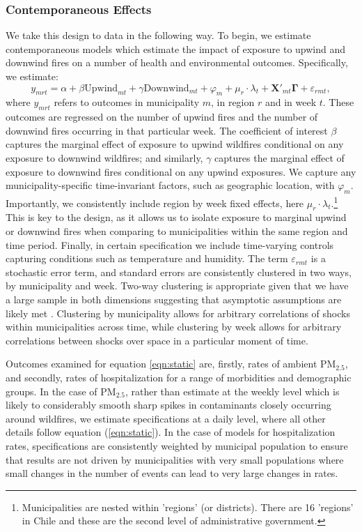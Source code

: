 \documentclass[11pt]{article}
\begin{document}
\begin{spacing}{1.5}
\subsubsection{Contemporaneous Effects}
We take this design to data in the following way.  To begin, we estimate contemporaneous models which estimate the impact of exposure to upwind and downwind fires on a number of health and environmental outcomes.  Specifically, we estimate:
\begin{equation}
\label{eqn:static}
y_{mrt}=\alpha + \beta\text{Upwind}_{mt} + \gamma\text{Downwind}_{mt} + \varphi_m + \mu_r\cdot\lambda_t + \bm{X}'_{mt}\bm{\Gamma} + \varepsilon_{rmt},
\end{equation}
where $y_{mrt}$ refers to outcomes in municipality $m$, in region $r$ and in week $t$.  These outcomes are regressed on the number of upwind fires and the number of downwind fires occurring in that particular week.  The coefficient of interest $\beta$ captures the marginal effect of exposure to upwind wildfires conditional on any exposure to downwind wildfires; and similarly, $\gamma$ captures the marginal effect of exposure to downwind fires conditional on any upwind exposures.  We capture any municipality-specific time-invariant factors, such as geographic location, with $\varphi_m$.  Importantly, we consistently include region by week fixed effects, here $\mu_r\cdot\lambda_t$.\footnote{Municipalities are nested within 'regions' (or districts). There are 16 'regions' in Chile and these are the second level of administrative government.}  This is key to the design, as it allows us to isolate exposure to marginal upwind or downwind fires when comparing to municipalities within the same region and time period.  Finally, in certain specification we include time-varying controls capturing conditions such as temperature and humidity. The term $\varepsilon_{rmt}$ is a stochastic error term, and standard errors are consistently clustered in two ways, by municipality and week.  Two-way clustering is appropriate given that we have a large sample in both dimensions suggesting that asymptotic assumptions are likely met \citep{CameronMiller2015}.  Clustering by municipality allows for arbitrary correlations of shocks within municipalities across time, while clustering by week allows for arbitrary correlations between shocks over space in a particular moment of time. 

Outcomes examined for equation \ref{eqn:static} are, firstly, rates of ambient PM$_{2.5}$, and secondly, rates of hospitalization for a range of morbidities and demographic groups.  In the case of PM$_{2.5}$, rather than estimate at the weekly level which is likely to considerably smooth sharp spikes in contaminants closely occurring around wildfires, we estimate specifications at a daily level, where all other details follow equation (\ref{eqn:static}). In the case of models for hospitalization rates, specifications are consistently weighted by municipal population to ensure that results are not driven by municipalities with very small populations where small changes in the number of events can lead to very large changes in rates.


\end{spacing}
\end{document}
